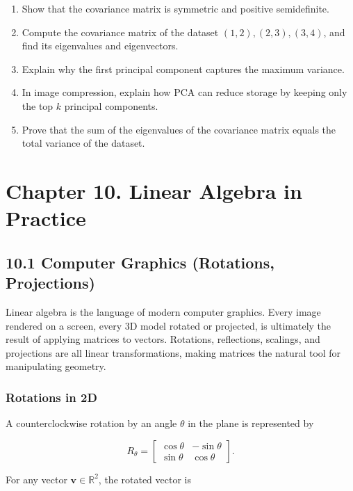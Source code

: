 \documentclass[
  12pt,
  a4paper,
]{article}
\let\oldsection\section
\renewcommand{\section}{\clearpage\oldsection}
\begin{document}
\begin{enumerate}
\def\labelenumi{\arabic{enumi}.}
\item
  Show that the covariance matrix is symmetric and positive
  semidefinite.
\item
  Compute the covariance matrix of the dataset \((1,2), (2,3), (3,4)\),
  and find its eigenvalues and eigenvectors.
\item
  Explain why the first principal component captures the maximum
  variance.
\item
  In image compression, explain how PCA can reduce storage by keeping
  only the top \(k\) principal components.
\item
  Prove that the sum of the eigenvalues of the covariance matrix equals
  the total variance of the dataset.
\end{enumerate}

\section{Chapter 10. Linear Algebra in
Practice}\label{chapter-10-linear-algebra-in-practice}

\subsection{10.1 Computer Graphics (Rotations,
Projections)}\label{101-computer-graphics-rotations-projections}

Linear algebra is the language of modern computer graphics. Every image
rendered on a screen, every 3D model rotated or projected, is ultimately
the result of applying matrices to vectors. Rotations, reflections,
scalings, and projections are all linear transformations, making
matrices the natural tool for manipulating geometry.

\subsubsection{Rotations in 2D}\label{rotations-in-2d}

A counterclockwise rotation by an angle \(\theta\) in the plane is
represented by

\[R_\theta = 
\begin{bmatrix}
\cos\theta & -\sin\theta \\
\sin\theta & \cos\theta
\end{bmatrix}.\]

For any vector \(\mathbf{v} \in \mathbb{R}^2\), the rotated vector is
\end{document}
